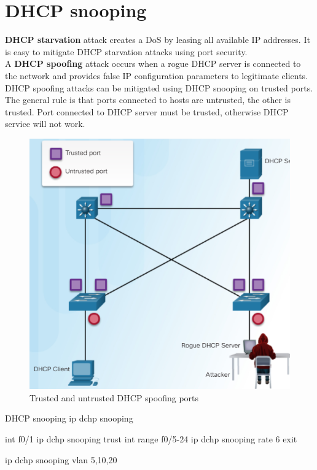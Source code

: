 \section{DHCP snooping}

\textbf{DHCP starvation} attack creates a DoS by leasing all available IP addresses. It is easy to mitigate DHCP starvation attacks using port security. \\

A \textbf{DHCP spoofing} attack occurs when a rogue DHCP server is connected to the network and provides false IP configuration parameters to legitimate clients. DHCP spoofing attacks can be mitigated using DHCP snooping on trusted ports. The general rule is that ports connected to hosts are untrusted, the other is trusted. Port connected to DHCP server must be trusted, otherwise DHCP service will not work.

\begin{figure}[hbtp]
\caption{Trusted and untrusted DHCP spoofing ports}\label{DHCPspoofing}
\centering
\includegraphics[scale=1]{pictures/DHCPspoofing.PNG}
\end{figure}

\begin{sexylisting}{DHCP snooping}
ip dchp snooping
 
int f0/1
ip dchp snooping trust
int range f0/5-24
ip dchp snooping rate 6
exit

ip dchp snooping vlan 5,10,20
\end{sexylisting}


